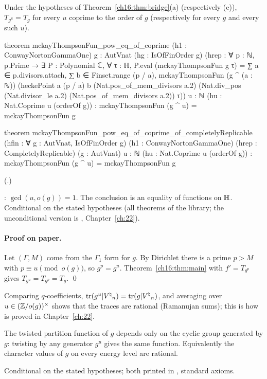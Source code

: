 \begin{theorem}\label{ch16:thm:galois}
Under the hypotheses of Theorem~\ref{ch16:thm:bridge}(a) (respectively (c)), $T_{g^u}=T_g$ for every $u$ coprime to the
order of $g$ (respectively for every $g$ and every such $u$).
\end{theorem}
\begin{leancode}
theorem mckayThompsonFun_pow_eq_of_coprime (h1 : ConwayNortonGammaOne) {g : AutVnat}
    (hg : IsOfFinOrder g)
    (hrep : ∀ p : ℕ, p.Prime → ∃ P : Polynomial ℂ, ∀ τ : ℍ, P.eval (mckayThompsonFun g τ) =
      ∑ a ∈ p.divisors.attach, ∑ b ∈ Finset.range (p / a),
        mckayThompsonFun (g ^ (a : ℕ)) (heckePoint a (p / a) b (Nat.pos_of_mem_divisors a.2)
          (Nat.div_pos (Nat.divisor_le a.2) (Nat.pos_of_mem_divisors a.2)) τ))
    {u : ℕ} (hu : Nat.Coprime u (orderOf g)) :
    mckayThompsonFun (g ^ u) = mckayThompsonFun g

theorem mckayThompsonFun_pow_eq_of_coprime_of_completelyReplicable
    (hfin : ∀ g : AutVnat, IsOfFinOrder g) (h1 : ConwayNortonGammaOne)
    (hrep : CompletelyReplicable) (g : AutVnat) {u : ℕ} (hu : Nat.Coprime u (orderOf g)) :
    mckayThompsonFun (g ^ u) = mckayThompsonFun g
\end{leancode}
(.)
\begin{dictionary}
: $\gcd(u,o(g))=1$.  The conclusion is an equality of functions on $\mathbb{H}$.
Conditional on the stated hypotheses (all theorems of the library; the unconditional version is
, Chapter~\ref{ch:22}).
\end{dictionary}
\paragraph{Proof on paper.}  Let $(\Gamma,M)$ come from the $\Gamma_1$ form for $g$.  By Dirichlet there is a prime
$p>M$ with $p\equiv u\pmod{o(g)}$, so $g^p=g^u$.  Theorem~\ref{ch16:thm:main} with $f'=T_{g^p}$ gives
$T_{g^u}=T_{g^p}=T_g$. \qed

Comparing $q$-coefficients, $\operatorname{tr}(g^u|{V^{\natural}}_n)=\operatorname{tr}(g|{V^{\natural}}_n)$, and averaging over $u\in({\mathbb{Z}}/o(g))^\times$ shows that the
traces are rational (Ramanujan sums); this is how  is proved in Chapter~\ref{ch:22}.
\begin{physics}
The twisted partition function of $g$ depends only on the cyclic group generated by $g$: twisting by any generator
$g^u$ gives the same function.  Equivalently the character values of $g$ on every energy level are rational.
\end{physics}
\begin{status}
Conditional on the stated hypotheses; both printed in ,
standard axioms.
\end{status}

